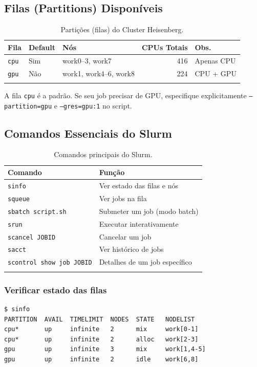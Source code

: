 \documentclass[11pt, a4paper]{article}
\newcommand{\cmd}[1]{\texttt{\textcolor{codeblue}{#1}}}
\begin{document}
\subsection{Filas (Partitions) Disponíveis}

\begin{longtable}{lllrl}
  \toprule
  \textbf{Fila} & \textbf{Default} & \textbf{Nós} & \textbf{CPUs Totais} & \textbf{Obs.} \\
  \midrule
  \endhead
  \texttt{cpu} & Sim & work0--3, work7 & 416 & Apenas CPU \\
  \texttt{gpu} & Não & work1, work4--6, work8 & 224 & CPU + GPU \\
  \bottomrule
  \caption{Partições (filas) do Cluster Heisenberg.}
\end{longtable}

\begin{atencao}
  A fila \texttt{cpu} é a padrão. Se seu job precisar de GPU, especifique
  explicitamente \texttt{--partition=gpu} e \texttt{--gres=gpu:1} no script.
\end{atencao}

\subsection{Comandos Essenciais do Slurm}

\begin{longtable}{ll}
  \toprule
  \textbf{Comando} & \textbf{Função} \\
  \midrule
  \endhead
  \cmd{sinfo} & Ver estado das filas e nós \\
  \cmd{squeue} & Ver jobs na fila \\
  \cmd{sbatch script.sh} & Submeter um job (modo batch) \\
  \cmd{srun} & Executar interativamente \\
  \cmd{scancel JOBID} & Cancelar um job \\
  \cmd{sacct} & Ver histórico de jobs \\
  \cmd{scontrol show job JOBID} & Detalhes de um job específico \\
  \bottomrule
  \caption{Comandos principais do Slurm.}
\end{longtable}

\subsubsection{Verificar estado das filas}

\begin{lstlisting}[style=terminal]
$ sinfo
PARTITION  AVAIL  TIMELIMIT  NODES  STATE   NODELIST
cpu*       up     infinite   2      mix     work[0-1]
cpu*       up     infinite   2      alloc   work[2-3]
gpu        up     infinite   3      mix     work[1,4-5]
gpu        up     infinite   2      idle    work[6,8]
\end{lstlisting}
\end{document}
